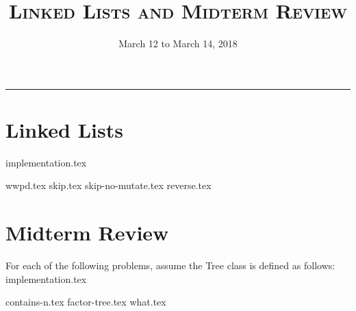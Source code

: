 \documentclass{exam}
\title{\textsc{Linked Lists and Midterm Review}}
\date{March 12 to March 14, 2018}
\begin{document}
\maketitle
\rule{\textwidth}{0.15em}
\fontsize{12}{15}\selectfont

\section{Linked Lists}
{implementation.tex}
\begin{questions}
\newpage
{wwpd.tex}
\newpage
{skip.tex}
{skip-no-mutate.tex}
\newpage
{reverse.tex}
\end{questions}

\section{Midterm Review}
For each of the following problems, assume the Tree class is defined as follows:
\vspace{2\baselineskip}
{implementation.tex}
\vspace{\baselineskip}
\begin{questions}
{contains-n.tex}
\newpage
{factor-tree.tex}
\newpage
{what.tex}
\end{questions}
\end{document}
